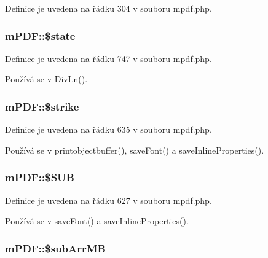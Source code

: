 Definice je uvedena na řádku 304 v souboru mpdf.\-php.

\hypertarget{classm_p_d_f_a5f98ecb221ba30830180085f78d82b07}{
\subsubsection[{\$state}]{\setlength{\rightskip}{0pt plus 5cm}m\-P\-D\-F\-::\$state}}\label{classm_p_d_f_a5f98ecb221ba30830180085f78d82b07}


Definice je uvedena na řádku 747 v souboru mpdf.\-php.



Používá se v Div\-Ln().

\hypertarget{classm_p_d_f_a4fb560ac09d95cb64c601c6434f6bf6e}{
\subsubsection[{\$strike}]{\setlength{\rightskip}{0pt plus 5cm}m\-P\-D\-F\-::\$strike}}\label{classm_p_d_f_a4fb560ac09d95cb64c601c6434f6bf6e}


Definice je uvedena na řádku 635 v souboru mpdf.\-php.



Používá se v printobjectbuffer(), save\-Font() a save\-Inline\-Properties().

\hypertarget{classm_p_d_f_a7715c7b45fc04939679263e8e7009208}{
\subsubsection[{\$\-S\-U\-B}]{\setlength{\rightskip}{0pt plus 5cm}m\-P\-D\-F\-::\$\-S\-U\-B}}\label{classm_p_d_f_a7715c7b45fc04939679263e8e7009208}


Definice je uvedena na řádku 627 v souboru mpdf.\-php.



Používá se v save\-Font() a save\-Inline\-Properties().

\hypertarget{classm_p_d_f_a298578ab7f8bbce10913f4a4bf4b239d}{
\subsubsection[{\$sub\-Arr\-M\-B}]{\setlength{\rightskip}{0pt plus 5cm}m\-P\-D\-F\-::\$sub\-Arr\-M\-B}}\label{classm_p_d_f_a298578ab7f8bbce10913f4a4bf4b239d}


